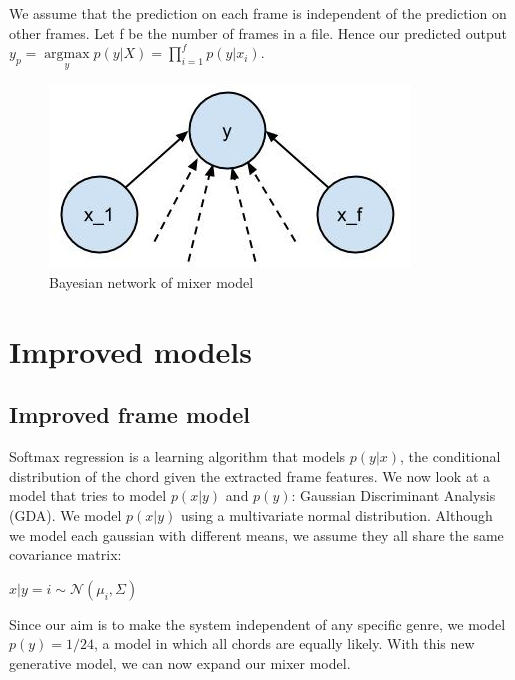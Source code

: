 \documentclass{article}
\begin{document}
We assume that the prediction on each frame is independent of the prediction on other frames. Let f be the number of frames in a file.
Hence our predicted output $y_p = \underset{y}{\operatorname{argmax}} p(y | X) = \prod_{i=1}^fp(y | x_i)$. 
\begin{figure}[ht]
\vskip 0.2in
\begin{center}
\centerline{\includegraphics[width=\columnwidth]{f1}}
\caption{Bayesian network of mixer model}
\label{icml-historical}
\end{center}
\vskip -0.2in
\end{figure}

\section{Improved models}
\subsection{Improved frame model}
Softmax regression is a learning algorithm that models $p(y|x)$, the conditional distribution of the chord given the extracted frame features. We now look at a model that tries to model $p(x|y)$ and $p(y)$: Gaussian Discriminant Analysis (GDA). We model $p(x|y)$ using a multivariate normal distribution. Although we model each gaussian with different means, we assume they all share the same covariance matrix:

$x|y=i \sim \mathcal{N}$$(\mu_i, \Sigma)$

Since our aim is to make the system independent of any specific genre, we model $p(y) = 1/24$, a model in which all chords are equally likely. With this new generative model, we can now expand our mixer model.
\end{document}
